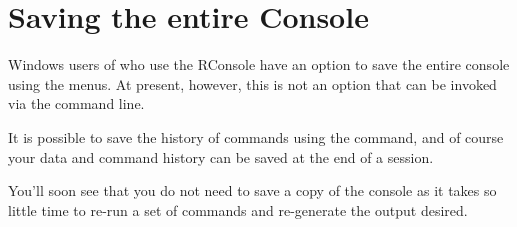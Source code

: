 \section{Saving the entire \R{} Console} 
 
Windows users of \R{} who use the RConsole have an option to save the entire console using the menus. At present, however, this is not an option that can be invoked via the command line. 
 
It is possible to save the history of commands using the  command, and of course your data and command history can be saved at the end of a session. 
 
You'll soon see that you do not need to save a copy of the \R{} console as it takes so little time to re-run a set of commands and re-generate the output desired. 
 
 
 



